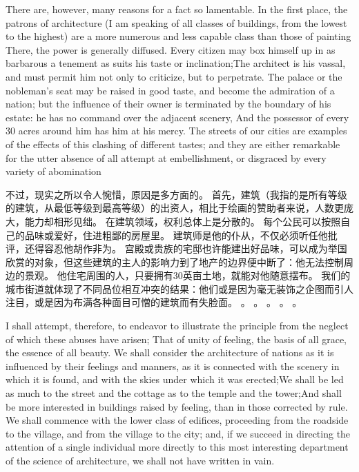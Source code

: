 \documentclass[cs4size, a4paper, 12pt]{article}
\newcounter{numpar}
\newcommand*{\newpar}{\numpar{}}
\begin{document}
	\newpar There are, however, many reasons for a fact so lamentable. In the first place, the patrons of architecture (I am speaking of all classes of buildings, from the lowest to the highest) are a more numerous and less capable class than those of painting There, the power is generally diffused. Every citizen may box himself up in as barbarous a tenement as suits his taste or inclination;The architect is his vassal, and must permit him not only to criticize, but to perpetrate. The palace or the nobleman’s seat may be raised in good taste, and become the admiration of a nation; but the influence of their owner is terminated by the boundary of his estate: he has no command over the adjacent scenery, And the possessor of every 30 acres around him has him at his mercy. The streets of our cities are examples of the effects of this clashing of different tastes; and they are either remarkable for the utter absence of all attempt at embellishment, or disgraced by every variety of abomination
	
	不过，现实之所以令人惋惜，原因是多方面的。 首先，建筑（我指的是所有等级的建筑，从最低等级到最高等级）的出资人，相比于绘画的赞助者来说，人数更庞大，能力却相形见绌。 在建筑领域，权利总体上是分散的。 每个公民可以按照自己的品味或爱好，住进粗鄙的房屋里。 建筑师是他的仆从，不仅必须听任他批评，还得容忍他胡作非为。 宫殿或贵族的宅邸也许能建出好品味，可以成为举国欣赏的对象，但这些建筑的主人的影响力到了地产的边界便中断了：他无法控制周边的景观。 他住宅周围的人，只要拥有30英亩土地，就能对他随意摆布。 我们的城市街道就体现了不同品位相互冲突的结果：他们或是因为毫无装饰之企图而引人注目，或是因为布满各种面目可憎的建筑而有失脸面。 。 。 。 。 。 
	
	\newpar I shall attempt, therefore, to endeavor to illustrate the principle from the neglect of which these abuses have arisen; That of unity of feeling, the basis of all grace, the essence of all beauty. We shall consider the architecture of nations as it is influenced by their feelings and manners, as it is connected with the scenery in which it is found, and with the skies under which it was erected;We shall be led as much to the street and the cottage as to the temple and the tower;And shall be more interested in buildings raised by feeling, than in those corrected by rule. We shall commence with the lower class of edifices, proceeding from the roadside to the village, and from the village to the city; and, if we succeed in directing the attention of a single individual more directly to this most interesting department of the science of architecture, we shall not have written in vain.
	
\end{document}
